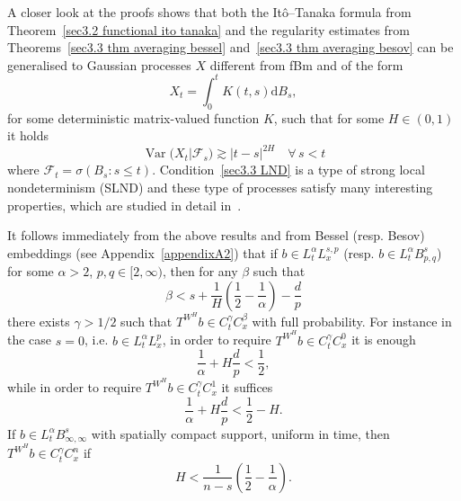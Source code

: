\documentclass[10pt]{article}
\newcommand{\mathd}{\mathrm{d}}
\newcommand{\nobracket}{}
\newcommand{\tmop}[1]{\ensuremath{\operatorname{#1}}}
\begin{document}
\begin{remark}
  \label{sec3.3 remark lnd}A closer look at the proofs shows that both the
  It\^{o}--Tanaka formula from Theorem~\ref{sec3.2 functional ito tanaka} and
  the regularity estimates from Theorems~\ref{sec3.3 thm averaging bessel}
  and~\ref{sec3.3 thm averaging besov} can be generalised to Gaussian
  processes $X$ different from fBm and of the form
  \[ X_t = \int_0^t K (t, s) \mathd B_s, \]
  for some deterministic matrix\mbox{-}valued function $K$, such that for some
  $H \in (0, 1)$ it holds
  \begin{equation}
    \tmop{Var} (X_t | \mathcal{F}_s \nobracket) \gtrsim | t - s |^{2 H} \quad
    \forall \, s < t \label{sec3.3 LND}
  \end{equation}
  where $\mathcal{F}_t = \sigma (B_s : s \leqslant t)$.
  Condition~{\eqref{sec3.3 LND}} is a type of strong local nondeterminism
  (SLND) and these type of processes satisfy many interesting properties,
  which are studied in detail in~{\cite{galeatigubinelli}}.
\end{remark}

\begin{remark}
  \label{sec3.3 remark embedding}It follows immediately from the above results
  and from Bessel (resp. Besov) embeddings (see Appendix~\ref{appendixA2})
  that if $b \in L^{\alpha}_t L^{s, p}_x$ (resp. $b \in L^{\alpha}_t B^s_{p,
  q}$) for some $\alpha > 2$, $p, q \in [2, \infty)$, then for any $\beta$
  such that
  \begin{equation}
    \beta < s + \frac{1}{H} \left( \frac{1}{2} - \frac{1}{\alpha} \right) -
    \frac{d}{p} \label{sec3.3 eq remark embedding}
  \end{equation}
  there exists $\gamma > 1 / 2$ such that $T^{W^H} b \in C^{\gamma}_t
  C^{\beta}_x$ with full probability. For instance in the case $s = 0$, i.e.
  $b \in L^{\alpha}_t L^p_x$, in order to require $T^{W^H} b \in C^{\gamma}_t
  C^0_x$ it is enough
  \[ \frac{1}{\alpha} + H \frac{d}{p} < \frac{1}{2}, \]
  while in order to require $T^{W^H} b \in C^{\gamma}_t C^1_x$ it suffices
  \[ \frac{1}{\alpha} + H \frac{d}{p} < \frac{1}{2} - H. \]
  If $b \in L^{\alpha}_t B^s_{\infty, \infty}$ with spatially compact support,
  uniform in time, then $T^{W^H} b \in C^{\gamma}_t C^n_x$ if
  \[ H < \frac{1}{n - s} \left( \frac{1}{2} - \frac{1}{\alpha} \right) . \]
\end{remark}
\end{document}
